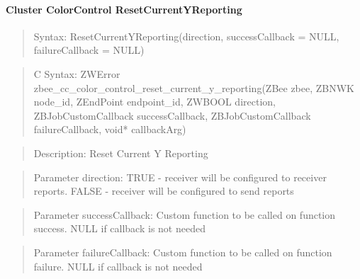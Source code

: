 \paragraph{Cluster ColorControl ResetCurrentYReporting}
\begin{quote}Syntax: ResetCurrentYReporting(direction, successCallback = NULL, failureCallback = NULL)\end{quote}
\begin{quote}C Syntax: ZWError zbee\_cc\_color\_control\_reset\_current\_y\_reporting(ZBee zbee, ZBNWK node\_id, ZEndPoint endpoint\_id, ZWBOOL direction, ZBJobCustomCallback successCallback, ZBJobCustomCallback failureCallback, void* callbackArg)\end{quote}
\begin{quote}Description: Reset Current Y Reporting\end{quote}
\begin{quote}Parameter direction: TRUE  - receiver will be configured to receiver reports. FALSE - receiver will be configured to send reports\end{quote}
\begin{quote}Parameter successCallback: Custom function to be called on function success. NULL if callback is not needed\end{quote}
\begin{quote}Parameter failureCallback: Custom function to be called on function failure. NULL if callback is not needed\end{quote}


